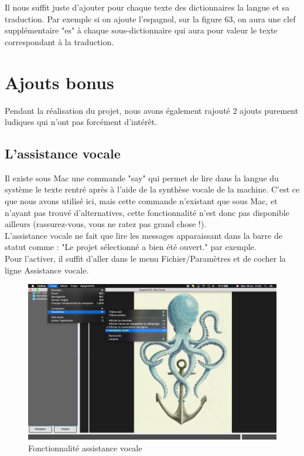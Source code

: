 \documentclass[a4paper,12pt]{article}
\begin{document}
	Il nous suffit juste d'ajouter pour chaque texte des dictionnaires la langue et sa traduction. Par exemple si on ajoute l'espagnol, sur la figure 63, on aura une clef supplémentaire "es" à chaque sous-dictionnaire qui aura pour valeur le texte correspondant à la traduction.

\section{Ajouts bonus}

	Pendant la réalisation du projet, nous avons également rajouté 2 ajouts purement ludiques qui n'ont pas forcément d'intérêt. 
	
	\subsection{L'assistance vocale}
	
		Il existe sous Mac une commande "say" qui permet de lire dans la langue du système le texte rentré après à l'aide de la synthèse vocale de la machine. C'est ce que nous avons utilisé ici, mais cette commande n'existant que sous Mac, et n'ayant pas trouvé d'alternatives, cette fonctionnalité n'est donc pas disponible ailleurs (rassurez-vous, vous ne ratez pas grand chose !).\\
		
		L'assistance vocale ne fait que lire les messages apparaissant dans la barre de statut comme : "Le projet sélectionné a bien été ouvert." par exemple.\\
		
		Pour l'activer, il suffit d'aller dans le menu Fichier/Paramètres et de cocher la ligne Assistance vocale.
		
		\begin{figure}[h!]
			\begin{center}
					\includegraphics[scale=0.15]{images/assist_voc}
					\caption{Fonctionnalité assistance vocale}
			\end{center}
	\end{figure}
	
\end{document}
